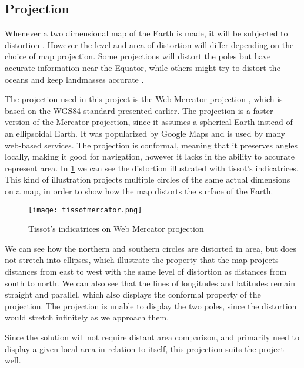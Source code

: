 \subsection{Projection}

Whenever a two dimensional map of the Earth is made, it will be subjected to distortion \cite{projectionalbum}. However the level and area of distortion will differ depending on the choice of map projection. Some projections will distort the poles but have accurate information near the Equator, while others might try to distort the oceans and keep landmasses accurate \cite{website:Wikipedia-mapprojections}.

The projection used in this project is the Web Mercator projection \cite{webmercator}, which is based on the WGS84 standard presented earlier. The projection is a faster version of the Mercator projection, since it assumes a spherical Earth instead of an ellipsoidal Earth. It was popularized by Google Maps and is used by many web-based services. The projection is conformal, meaning that it preserves angles locally, making it good for navigation, however it lacks in the ability to accurate represent area\cite{mercatorcritique}. In \cref{tissots} we can see the distortion illustrated with tissot's indicatrices\cite{tissot}. This kind of illustration projects multiple circles of the same actual dimensions on a map, in order to show how the map distorts the surface of the Earth.

\begin{figure}
    \centering
\texttt{[image: tissotmercator.png]}
\caption{Tissot's indicatrices on Web Mercator projection}
\label{tissots}
\end{figure}


We can see how the northern and southern circles are distorted in area, but does not stretch into ellipses, which illustrate the property that the map projects distances from east to west with the same level of distortion as distances from south to north. We can also see that the lines of longitudes and latitudes remain straight and parallel, which also displays the conformal property of the projection. The projection is unable to display the two poles, since the distortion would stretch infinitely as we approach them.

Since the solution will not require distant area comparison, and primarily need to display a given local area in relation to itself, this projection suits the project well.


